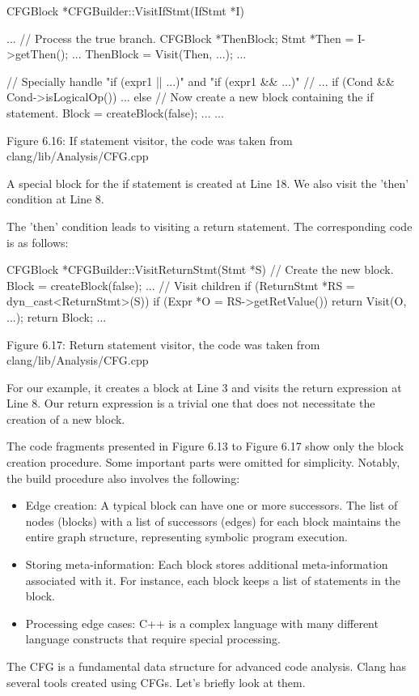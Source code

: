 \begin{cpp}
CFGBlock *CFGBuilder::VisitIfStmt(IfStmt *I) {
  ...
  // Process the true branch.
  CFGBlock *ThenBlock;
  {
    Stmt *Then = I->getThen();
    ...
    ThenBlock = Visit(Then, ...);
    ...
  }

  // Specially handle "if (expr1 || ...)" and "if (expr1 && ...)"
  // ...
  if (Cond && Cond->isLogicalOp())
    ...
  else {
    // Now create a new block containing the if statement.
    Block = createBlock(false);
    ...
  }
  ...
}
\end{cpp}


\begin{center}
Figure 6.16: If statement visitor, the code was taken from clang/lib/Analysis/CFG.cpp
\end{center}

A special block for the if statement is created at Line 18. We also visit the ’then’ condition at Line 8.

The ’then’ condition leads to visiting a return statement. The corresponding code is as follows:

\begin{cpp}
CFGBlock *CFGBuilder::VisitReturnStmt(Stmt *S) {
  // Create the new block.
  Block = createBlock(false);
  ...
  // Visit children
  if (ReturnStmt *RS = dyn_cast<ReturnStmt>(S)) {
    if (Expr *O = RS->getRetValue())
      return Visit(O, ...);
    return Block;
  }
  ...
}
\end{cpp}

\begin{center}
Figure 6.17: Return statement visitor, the code was taken from clang/lib/Analysis/CFG.cpp
\end{center}

For our example, it creates a block at Line 3 and visits the return expression at Line 8. Our return expression is a trivial one that does not necessitate the creation of a new block.

The code fragments presented in Figure 6.13 to Figure 6.17 show only the block creation procedure. Some important parts were omitted for simplicity. Notably, the build procedure also involves the following:

\begin{itemize}
\item
Edge creation: A typical block can have one or more successors. The list of nodes (blocks) with a list of successors (edges) for each block maintains the entire graph structure, representing symbolic program execution.

\item
Storing meta-information: Each block stores additional meta-information associated with it. For instance, each block keeps a list of statements in the block.

\item
Processing edge cases: C++ is a complex language with many different language constructs that require special processing.
\end{itemize}

The CFG is a fundamental data structure for advanced code analysis. Clang has several tools created using CFGs. Let’s briefly look at them.

















